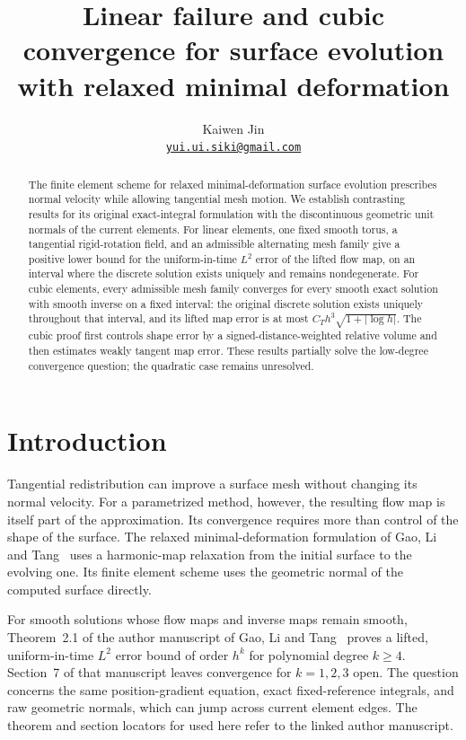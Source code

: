 \documentclass[11pt,a4paper]{article}
\title{Linear failure and cubic convergence for surface evolution\\
with relaxed minimal deformation}
\author{Kaiwen Jin\\[2pt]\small\href{mailto:yui.ui.siki@gmail.com}{\texttt{yui.ui.siki@gmail.com}}}
\date{}
\numberwithin{equation}{section}
\theoremstyle{remark}
\begin{document}
\maketitle
\begin{abstract}
The finite element scheme for relaxed minimal-deformation surface evolution
prescribes normal velocity while allowing tangential mesh motion.
We establish contrasting results for its original exact-integral formulation
with the discontinuous geometric unit normals of the current elements.
For linear elements, one fixed smooth torus, a tangential rigid-rotation
field, and an admissible alternating mesh family give a positive lower
bound for the uniform-in-time \(L^2\) error of the lifted flow map,
on an interval where the discrete solution exists uniquely and remains
nondegenerate. For cubic elements, every admissible mesh family converges
for every smooth exact solution with smooth inverse on a fixed interval:
the original discrete solution exists uniquely throughout that interval,
and its lifted map error is at most \(C_T h^3\sqrt{1+|\log h|}\).
The cubic proof first controls shape error by a signed-distance-weighted
relative volume and then estimates weakly tangent map error.
These results partially solve the low-degree convergence question;
the quadratic case remains unresolved.
\end{abstract}

\section{Introduction}\label{sec:intro}
Tangential redistribution can improve a surface mesh without changing
its normal velocity. For a parametrized method, however, the resulting
flow map is itself part of the approximation. Its convergence requires
more than control of the shape of the surface.
The relaxed minimal-deformation formulation of Gao, Li and
Tang~\cite{GLT2026} uses a harmonic-map relaxation from the initial
surface to the evolving one. Its finite element scheme uses the
geometric normal of the computed surface directly.

For smooth solutions whose flow maps and inverse maps remain smooth,
Theorem~2.1 of the author manuscript of Gao, Li and Tang~\cite{GLT2026}
proves a lifted, uniform-in-time \(L^2\) error bound of order \(h^k\)
for polynomial degree \(k\geq4\). Section~7 of that manuscript leaves
convergence for \(k=1,2,3\) open. The question concerns the same
position-gradient equation, exact fixed-reference integrals, and
raw geometric normals, which can jump across current element edges.
The theorem and section locators for \cite{GLT2026} used here refer
to the linked author manuscript.
\end{document}
